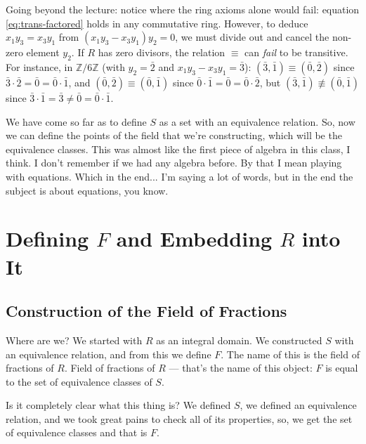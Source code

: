 \begin{content}
\begin{steps}
Going beyond the lecture: notice where the ring axioms alone would fail: equation \eqref{eq:trans-factored} holds in any commutative ring. However, to deduce $x_1 y_3 = x_3 y_1$ from $(x_1 y_3 - x_3 y_1)y_2 = 0$, we must divide out and cancel the non-zero element $y_2$. If $R$ has zero divisors, the relation $\equiv$ can \emph{fail} to be transitive. For instance, in $\mathbb{Z}/6\mathbb{Z}$ (with $y_2 = \bar{2}$ and $x_1 y_3 - x_3 y_1 = \bar{3}$): $(\bar{3}, \bar{1}) \equiv (\bar{0}, \bar{2})$ since $\bar{3} \cdot \bar{2} = \bar{0} = \bar{0} \cdot \bar{1}$, and $(\bar{0}, \bar{2}) \equiv (\bar{0}, \bar{1})$ since $\bar{0} \cdot \bar{1} = \bar{0} = \bar{0} \cdot \bar{2}$, but $(\bar{3}, \bar{1}) \not\equiv (\bar{0}, \bar{1})$ since $\bar{3} \cdot \bar{1} = \bar{3} \neq \bar{0} = \bar{0} \cdot \bar{1}$.
\end{steps}
\end{content}

\begin{speech}[00:50:02 - 00:51:06]
We have come so far as to define $S$ as a set with an equivalence relation. So, now we can define the points of the field that we're constructing, which will be the equivalence classes.
This was almost like the first piece of algebra in this class, I think. I don't remember if we had any algebra before. By that I mean playing with equations. Which in the end... I'm saying a lot of words, but in the end the subject is about equations, you know.
\end{speech}

\section{Defining \texorpdfstring{$F$}{F} and Embedding \texorpdfstring{$R$}{R} into It}

\subsection{Construction of the Field of Fractions}

\begin{speech}[00:51:06 - 00:51:50]
Where are we? We started with $R$ as an integral domain.  We constructed $S$ with an equivalence relation,  and from this we define $F$. The name of this is the field of fractions of $R$.  Field of fractions of $R$ --- that's the name of this object: $F$ is equal to the set of equivalence classes of $S$. 

Is it completely clear what this thing is? We defined $S$, we defined an equivalence relation, and we took great pains to check all of its properties, so, we get the set of equivalence classes and that is $F$.
\end{speech}

